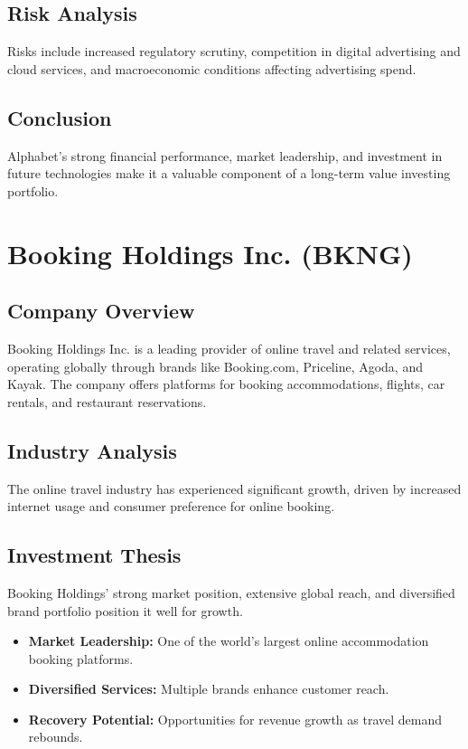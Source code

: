 \documentclass[12pt]{report}
\begin{document}
\section{Risk Analysis}
Risks include increased regulatory scrutiny, competition in digital advertising and cloud services, and macroeconomic conditions affecting advertising spend.

\section{Conclusion}
Alphabet's strong financial performance, market leadership, and investment in future technologies make it a valuable component of a long-term value investing portfolio.

\chapter{Booking Holdings Inc. (BKNG)}
\section{Company Overview}
Booking Holdings Inc. is a leading provider of online travel and related services, operating globally through brands like Booking.com, Priceline, Agoda, and Kayak. The company offers platforms for booking accommodations, flights, car rentals, and restaurant reservations.

\section{Industry Analysis}
The online travel industry has experienced significant growth, driven by increased internet usage and consumer preference for online booking.

\section{Investment Thesis}
Booking Holdings' strong market position, extensive global reach, and diversified brand portfolio position it well for growth.

\begin{itemize}
    \item \textbf{Market Leadership:} One of the world's largest online accommodation booking platforms.
    \item \textbf{Diversified Services:} Multiple brands enhance customer reach.
    \item \textbf{Recovery Potential:} Opportunities for revenue growth as travel demand rebounds.
\end{itemize}
\end{document}
